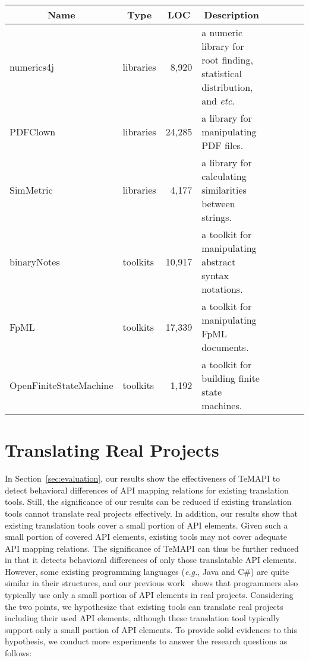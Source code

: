 \begin{table*}[t]
\centering
\begin{SmallOut}
\begin {tabular} {|l|l|r|l|c|c|c|c|}
\hline
\multicolumn{1}{|c|}{\textbf{Name}}& \multicolumn{1}{c|}{\textbf{Type}}& \multicolumn{1}{|c|}{\textbf{LOC} } &\multicolumn{1}{c|}{\textbf{Description}}\\
\hline\hline
numerics4j      &  libraries & 8,920   & a numeric library for root finding, statistical distribution, and \emph{etc}. \\
\hline
PDFClown    &  libraries  & 24,285   & a library for manipulating PDF files.\\
\hline
SimMetric & libraries & 4,177 & a library for calculating similarities between strings.\\
\hline
binaryNotes  &  toolkits & 10,917 &  a toolkit for manipulating abstract syntax notations.\\
\hline
FpML         &  toolkits   & 17,339  & a toolkit for manipulating FpML documents. \\
\hline
OpenFiniteStateMachine &  toolkits   & 1,192 & a toolkit for building finite state machines.\\
\hline
\end{tabular}%
 \label{table:subjects2}
\end{SmallOut}%
\end{table*}
\section{Translating Real Projects}
\label{sec:real}
In Section~\ref{sec:evaluation}, our results show the effectiveness of TeMAPI to detect behavioral differences of API mapping relations for existing translation tools. Still, the significance of our results can be reduced if existing translation tools cannot translate real projects effectively. In addition, our results show that existing translation tools cover a small portion of API elements. Given such a small portion of covered API elements, existing tools may not cover adequate API mapping relations. The significance of TeMAPI can thus be further reduced in that it detects behavioral differences of only those translatable API elements. However, some existing programming languages (\emph{e.g.}, Java and C\#) are quite similar in their structures, and our previous work~\citep{thummalapentaase08spotweb} shows that programmers also typically use only a small portion of API elements in real projects. Considering the two points, we hypothesize that existing tools can translate real projects including their used API elements, although these translation tool typically support only a small portion of API elements. To provide solid evidences to this hypothesis, we conduct more experiments to answer the research questions as follows:

